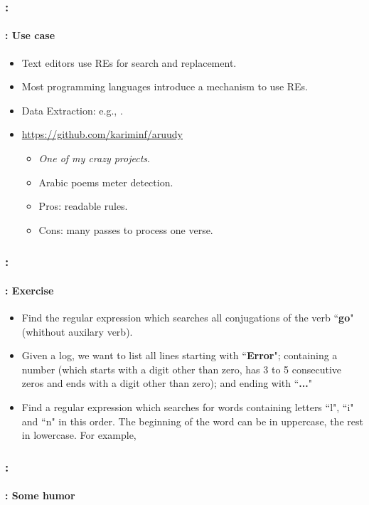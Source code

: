 \documentclass[xcolor=table]{beamer}
\begin{document}
\begin{frame}
	\frametitle{\insertshortsubtitle: \insertsection}
	\framesubtitle{\insertsubsection: Use case}

	\begin{itemize}
		\item Text editors use REs for search and replacement.
		\item Most programming languages introduce a mechanism to use REs.
		\item Data Extraction: e.g., .
		\item \url{https://github.com/kariminf/aruudy}
		\begin{itemize}
			\item \textit{One of my crazy projects}.
			\item Arabic poems meter detection.
			\item Pros: readable rules.
			\item Cons: many passes to process one verse.
		\end{itemize}
	\end{itemize}

\end{frame}


\begin{frame}
	\frametitle{\insertshortsubtitle: \insertsection}
	\framesubtitle{\insertsubsection: Exercise}
	
	\begin{itemize}
		\item Find the regular expression which searches all conjugations of the verb ``\textbf{go}" (whithout auxilary verb). 
		\item Given a log, we want to list all lines starting with ``\textbf{Error}"; containing a number (which starts with a digit other than zero, has 3 to 5 consecutive zeros and ends with a digit other than zero); and ending with ``\textbf{...}"
		\item Find a regular expression which searches for words containing letters ``l", ``i" and ``n" in this order. The beginning of the word can be in uppercase, the rest in lowercase. For example, 
	\end{itemize}
	
\end{frame}

\begin{frame}
	\frametitle{\insertshortsubtitle: \insertsection}
	\framesubtitle{\insertsubsection: Some humor}

	\begin{center}
	\end{center}

\end{frame}
\end{document}
